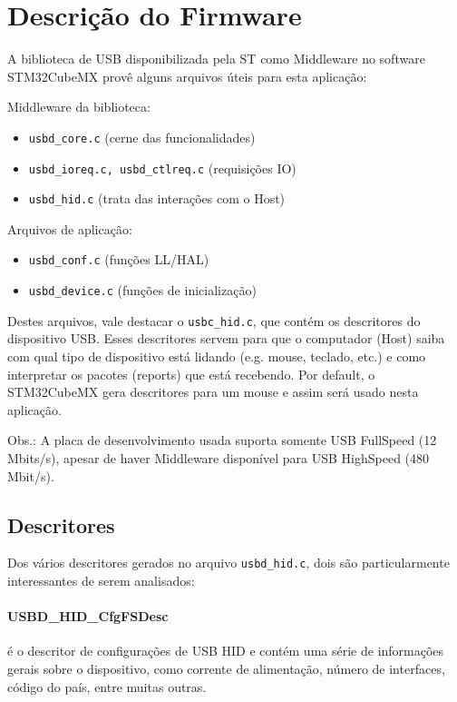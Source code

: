 \documentclass[a4paper,twocolumn,twoside,11pt]{article}
\begin{document}
\section{Descrição do Firmware}
A biblioteca de USB disponibilizada pela ST como Middleware no software STM32CubeMX provê alguns arquivos úteis para esta aplicação:

Middleware da biblioteca:
\begin{itemize}
    \item \texttt{usbd\_core.c} (cerne das funcionalidades)
    \item \texttt{usbd\_ioreq.c, usbd\_ctlreq.c} (requisições IO)
    \item \texttt{usbd\_hid.c} (trata das interações com o Host)
\end{itemize}

Arquivos de aplicação:
\begin{itemize}
    \item \texttt{usbd\_conf.c} (funções LL/HAL)
    \item \texttt{usbd\_device.c} (funções de inicialização)
\end{itemize}

Destes arquivos, vale destacar o \texttt{usbc\_hid.c}, que contém os descritores do dispositivo USB. Esses descritores servem para que o computador (Host) saiba com qual tipo de dispositivo está lidando (e.g. mouse, teclado, etc.) e como interpretar os pacotes (reports) que está recebendo. Por default, o STM32CubeMX gera descritores para um mouse e assim será usado nesta aplicação.

Obs.: A placa de desenvolvimento usada suporta somente USB FullSpeed (12 Mbits/s), apesar de haver Middleware disponível para USB HighSpeed (480 Mbit/s).

\subsection{Descritores}
Dos vários descritores gerados no arquivo \texttt{usbd\_hid.c}, dois são particularmente interessantes de serem analisados:

\paragraph{USBD\_HID\_CfgFSDesc} é o descritor de configurações de USB HID e contém uma série de informações gerais sobre o dispositivo, como corrente de alimentação, número de interfaces, código do país, entre muitas outras.
\end{document}
